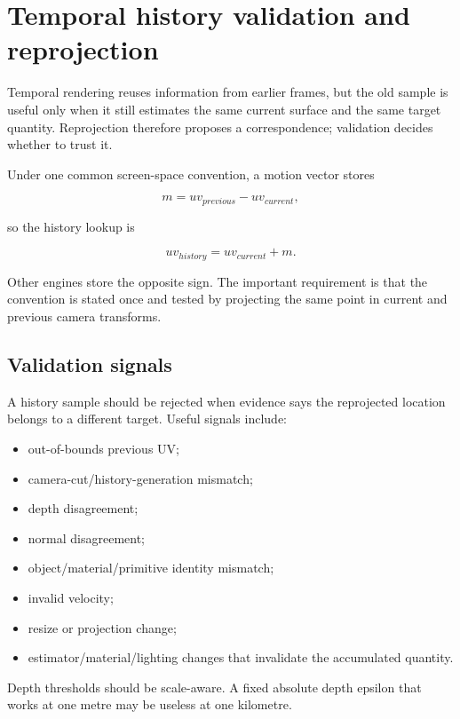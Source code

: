 \hypertarget{appendix-e8c352e39466}{}\label{referencestart:appendix-e8c352e39466}
\section{Temporal history validation and reprojection}\label{appendix-e8c352e39466-temporal-history-validation-and-reprojection}

Temporal rendering reuses information from earlier frames, but the old sample is useful only when it still estimates the same current surface and the same target quantity. Reprojection therefore proposes a correspondence; validation decides whether to trust it.

Under one common screen-space convention, a motion vector stores

\[
m = uv_{previous}-uv_{current},
\]

so the history lookup is

\[
uv_{history}=uv_{current}+m.
\]

Other engines store the opposite sign. The important requirement is that the convention is stated once and tested by projecting the same point in current and previous camera transforms.

\subsection{Validation signals}\label{appendix-e8c352e39466-validation-signals}

A history sample should be rejected when evidence says the reprojected location belongs to a different target. Useful signals include:

\begin{itemize}
\tightlist
\item
  out-of-bounds previous UV;
\item
  camera-cut/history-generation mismatch;
\item
  depth disagreement;
\item
  normal disagreement;
\item
  object/material/primitive identity mismatch;
\item
  invalid velocity;
\item
  resize or projection change;
\item
  estimator/material/lighting changes that invalidate the accumulated quantity.
\end{itemize}

Depth thresholds should be scale-aware. A fixed absolute depth epsilon that works at one metre may be useless at one kilometre.


